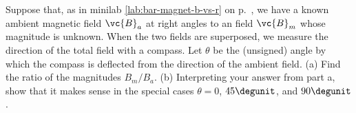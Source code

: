 Suppose that, as in minilab \ref{lab:bar-magnet-b-vs-r} on p.~\pageref{lab:bar-magnet-b-vs-r}, we have a
known ambient magnetic field $\vc{B}_a$ at right angles to an field $\vc{B}_m$ whose magnitude is unknown.
When the two fields are superposed, we measure the direction of the total
field with a compass. Let $\theta$ be the (unsigned) angle by which the compass is deflected from
the direction of the ambient field. (a) Find the ratio of the magnitudes
$B_m/B_a$.
\answercheck\hwendpart
(b) Interpreting your answer from part a, show that it makes sense in the special cases
$\theta=0$, $45\degunit$, and $90\degunit$.
